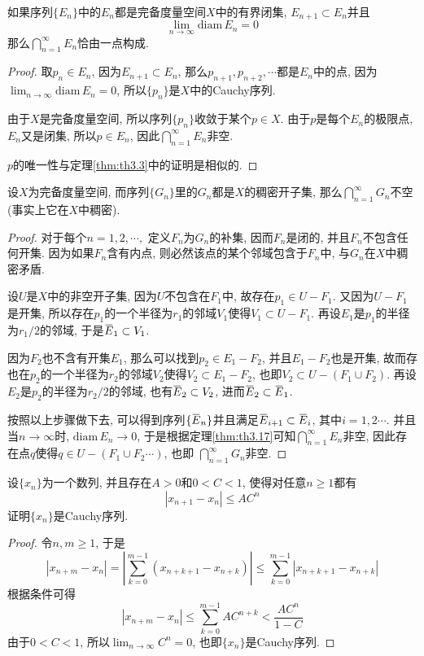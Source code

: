 \documentclass[cn,12pt,math=mtpro2,citestyle=gb7714-2015,bibstyle=gb7714-2015,twocol]{elegantbook}
\newcommand{\diam}{\text{diam}\,}
\newcommand{\limn }{\lim_{n\to\infty}}
\newcommand{\overbar}[1]{\mkern 1.5mu\overline{\mkern-1.5mu#1\mkern-1.5mu}\mkern 1.5mu}
\begin{document}
\begin{theorem}\label{thm:th3.17}
  如果序列$\{E_n\}$中的$E_n$都是完备度量空间$X$中的有界闭集, $E_{n+1}\subset E_n$并且
  $$\limn \diam E_n=0$$
  那么$\bigcap_{n=1}^{\infty}E_n$恰由一点构成.
\end{theorem}
\begin{proof}
  取$p_n\in E_n$, 因为$E_{n+1}\subset E_n$, 那么$p_{n+1},p_{n+2},\cdots$都是$E_n$中的点, 因为$\displaystyle\limn \diam E_n=0$, 所以$\{p_n\}$是$X$中的Cauchy序列.

  由于$X$是完备度量空间, 所以序列$\{p_n\}$收敛于某个$p\in X$. 由于$p$是每个$E_n$的极限点, $E_n$又是闭集, 所以$p\in E_n$, 因此$\bigcap_{n=1}^{\infty}E_n$非空.

  $p$的唯一性与定理\ref{thm:th3.3}中的证明是相似的.
\end{proof}
\begin{example}[$\,$Baire定理]
  设$X$为完备度量空间, 而序列$\{G_n\}$里的$G_n$都是$X$的稠密开子集, 那么$\bigcap_{n=1}^{\infty}G_n$不空(事实上它在$X$中稠密).
\end{example}
\begin{proof}
  对于每个$n=1,2,\cdots,$ 定义$F_n$为$G_n$的补集, 因而$F_n$是闭的, 并且$F_n$不包含任何开集. 因为如果$F_n$含有内点, 则必然该点的某个邻域包含于$F_n$中, 与$G_n$在$X$中稠密矛盾.

  设$U$是$X$中的非空开子集, 因为$U$不包含在$F_1$中, 故存在$p_1\in U-F_1$. 又因为$U-F_1$是开集, 所以存在$p_1$的一个半径为$r_1$的邻域$V_1$使得$V_1\subset U-F_1$. 再设$E_1$是$p_1$的半径为$r_1/2$的邻域, 于是$\overbar{E}_1\subset V_1$.

  因为$F_2$也不含有开集$E_1$, 那么可以找到$p_2\in E_1-F_2$, 并且$E_1-F_2$也是开集, 故而存也在$p_2$的一个半径为$r_2$的邻域$V_2$使得$V_2\subset E_1-F_2$, 也即$V_2\subset U-(F_1\cup F_2)$. 再设$E_2$是$p_2$的半径为$r_2/2$的邻域, 也有$\overbar{E}_2\subset V_2$, 进而$\overbar{E}_2\subset \overbar{E}_1$.

  按照以上步骤做下去, 可以得到序列$\{\overbar{E}_n\}$并且满足$\overbar{E}_{i+1}\subset \overbar{E}_i$, 其中$i=1,2\cdots$. 并且当$n\to\infty$时, $\diam E_n\to0$, 于是根据定理\ref{thm:th3.17}可知$\bigcap_{n=1}^{\infty}E_n$非空, 因此存在点$q$使得$q\in U-(F_1\cup F_2\cdots)$, 也即
  $\bigcap_{n=1}^{\infty}G_n$非空.

\end{proof}
\begin{example}
设$\{x_n\}$为一个数列, 并且存在$A>0$和$0<C<1$, 使得对任意$n\ge1$都有
$$|x_{n+1}-x_n|\leq AC^n$$
证明$\{x_n\}$是Cauchy序列.
\end{example}
\begin{proof}
  令$n, m\ge1$, 于是
  $$|x_{n+m}-x_n|=\left|\sum_{k=0}^{m-1}(x_{n+k+1}-x_{n+k})\right|\leq \sum_{k=0}^{m-1}|x_{n+k+1}-x_{n+k}|$$
  根据条件可得
  $$|x_{n+m}-x_n|\leq \sum_{k=0}^{m-1}AC^{n+k}<\frac{AC^n}{1-C}$$
  由于$0<C<1$, 所以$\limn C^n=0$, 也即$\{x_n\}$是Cauchy序列.
\end{proof}
\end{document}
